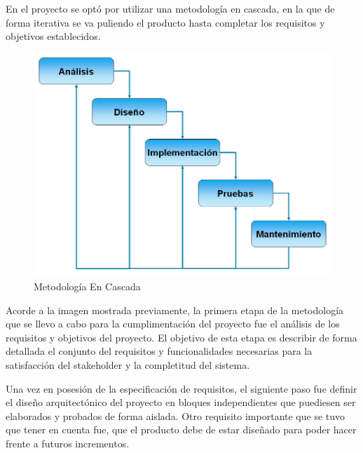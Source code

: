 \documentclass[a4paper,12pt]{article}
\begin{document}
	 	\vspace{5mm}
	 	
	 	
	 	En el proyecto se optó por utilizar una metodología en cascada, en la que de forma iterativa se va puliendo el producto hasta completar los requisitos y objetivos establecidos.
	 	
	 	\vspace{5mm}
	 	
	 	\begin{figure}[h]
	 		\centering
	 		\includegraphics[scale=0.5]{modelo-en-cascada.png}
	 		\caption{Metodología En Cascada}\label{fig:modelo-en-cascada}
	 	\end{figure}
 	
 		\vspace{5mm}
 	
 		Acorde a la imagen mostrada previamente, la primera etapa de la metodología que se llevo a cabo para la cumplimentación del proyecto fue el análisis de los requisitos y objetivos del proyecto. El objetivo de esta etapa es describir de forma detallada el conjunto del requisitos y funcionalidades necesarias para la satisfacción del stakeholder y la completitud del sistema.
 		
 		\vspace{5mm}
 		
 		Una vez en posesión de la especificación de requisitos, el siguiente paso fue definir el diseño arquitectónico del proyecto en bloques independientes que puediesen ser elaborados y probados de forma aislada. Otro requisito importante que se tuvo que tener en cuenta fue, que el producto debe de estar diseñado para poder hacer frente a futuros incrementos.
 		
\end{document}
